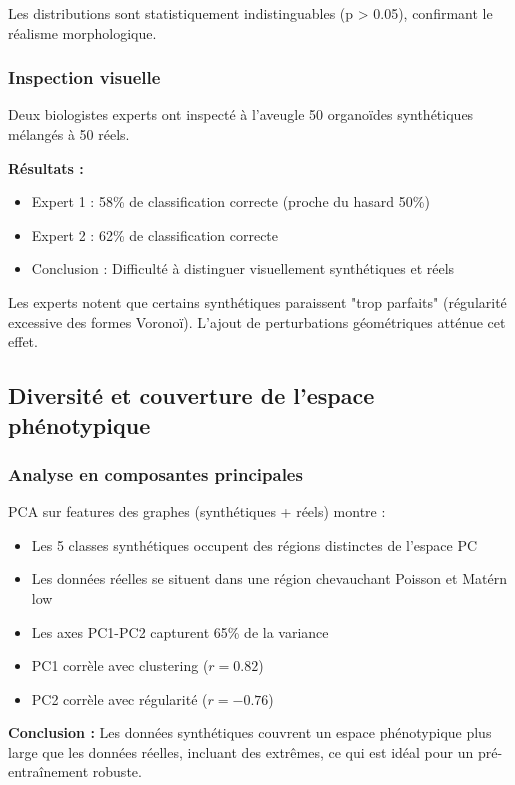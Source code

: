 Les distributions sont statistiquement indistinguables (p > 0.05), confirmant le réalisme morphologique.

\subsubsection{Inspection visuelle}

Deux biologistes experts ont inspecté à l'aveugle 50 organoïdes synthétiques mélangés à 50 réels.

\textbf{Résultats :}
\begin{itemize}
    \item Expert 1 : 58\% de classification correcte (proche du hasard 50\%)
    \item Expert 2 : 62\% de classification correcte
    \item Conclusion : Difficulté à distinguer visuellement synthétiques et réels
\end{itemize}

Les experts notent que certains synthétiques paraissent "trop parfaits" (régularité excessive des formes Voronoï). L'ajout de perturbations géométriques atténue cet effet.

\subsection{Diversité et couverture de l'espace phénotypique}

\subsubsection{Analyse en composantes principales}

PCA sur features des graphes (synthétiques + réels) montre :
\begin{itemize}
    \item Les 5 classes synthétiques occupent des régions distinctes de l'espace PC
    \item Les données réelles se situent dans une région chevauchant Poisson et Matérn low
    \item Les axes PC1-PC2 capturent 65\% de la variance
    \item PC1 corrèle avec clustering ($r = 0.82$)
    \item PC2 corrèle avec régularité ($r = -0.76$)
\end{itemize}

\textbf{Conclusion :}
Les données synthétiques couvrent un espace phénotypique plus large que les données réelles, incluant des extrêmes, ce qui est idéal pour un pré-entraînement robuste.


